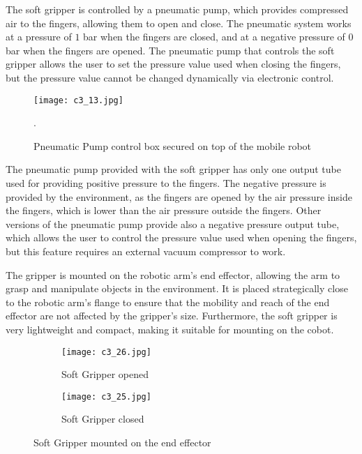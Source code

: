 The soft gripper is controlled by a pneumatic pump, which provides compressed air to the fingers, allowing them
to open and close. The pneumatic system works at a pressure of $1$ bar when the fingers are closed, and at
a negative pressure of $0$ bar when the fingers are opened. The pneumatic pump that controls the soft gripper
allows the user to set the pressure value used when closing the fingers, but the pressure value cannot be
changed dynamically via electronic control. 

\begin{figure}[t]
    \centering
    \texttt{[image: c3\_13.jpg]}
    \captionsetup{width=1\linewidth}
    \caption{Pneumatic Pump control box secured on top of the mobile robot}.
    \label{fig:c3_img13}
\end{figure}

The pneumatic pump provided with the soft gripper has only one output tube used for providing positive pressure
to the fingers. The negative pressure is provided by the environment, as the fingers are opened by the air pressure
inside the fingers, which is lower than the air pressure outside the fingers. 
Other versions of the pneumatic pump provide also a negative pressure output tube, which allows the user to control
the pressure value used when opening the fingers, but this feature requires an external vacuum compressor to work.

The gripper is mounted on the robotic arm's end effector, allowing the arm to grasp and manipulate
objects in the environment. It is placed strategically close to the robotic arm's flange to ensure
that the mobility and reach of the end effector are not affected by the gripper's size.
Furthermore, the soft gripper is very lightweight and compact, making it suitable for mounting on the cobot.

\begin{figure}[t]
    \centering
    \begin{subfigure}{0.45\textwidth}
        \texttt{[image: c3\_26.jpg]}
        \caption{Soft Gripper opened}
        \label{fig:opened}
    \end{subfigure}
    \hfill %
    \begin{subfigure}{0.45\textwidth}
        \texttt{[image: c3\_25.jpg]}
        \caption{Soft Gripper closed}
        \label{fig:closed}
    \end{subfigure}
    \caption{Soft Gripper mounted on the end effector}
    \label{fig:sg_combined}
\end{figure}

